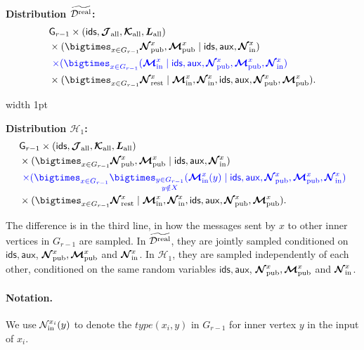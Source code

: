 \documentclass[11pt]{article}
\theoremstyle{definition}
\newcommand{\rv}[1]{\ensuremath{{\mathsf{#1}}}\xspace}
\newcommand{\Ninner}[2]{\ensuremath{\mathcal{N}_{\textnormal{in}}^{#1_{#2}}}}
\newcommand{\rNinner}[2]{\ensuremath{\bm{\mathcal{N}}_{\textnormal{in}}^{#1_{#2}}}}
\newcommand{\cH}{\ensuremath{\mathcal{H}}}
\newcommand{\cD}{\ensuremath{\mathcal{D}}}
\newcommand{\cDreal}{\ensuremath{\cD^{\textnormal{real}}}}
\newcommand{\cDrealtil}{\ensuremath{\widetilde{\cDreal}}}
\newcommand{\raux}{\ensuremath{\rv{aux}}}
\newcommand{\rcJall}{\ensuremath{\bm{\mathcal{J}}_{\textnormal{all}}}}
\newcommand{\rcKall}{\ensuremath{\bm{\mathcal{K}}_{\textnormal{all}}}}
\newcommand{\rLall}{\ensuremath{\bm{L}_{\textnormal{all}}}}
\newcommand{\rNpub}[1]{\ensuremath{\bm{\mathcal{N}}_{\textnormal{pub}}^{#1}}}
\newcommand{\rMpub}[1]{\ensuremath{\bm{\mathcal{M}}_{\textnormal{pub}}^{#1}}}
\newcommand{\rMinner}[1]{\ensuremath{\bm{\mathcal{M}}_{\textnormal{in}}^{#1}}}
\newcommand{\rNrest}[1]{\ensuremath{\bm{\mathcal{N}}^{#1}_{\textnormal{rest}}}}
\newcommand{\rG}{\ensuremath{\rv{G}}}
\newcommand{\rids}{\ensuremath{\rv{ids}}}
\begin{document}
\vspace{3mm}
\hspace{-1.5em}
\begin{minipage}{0.49\textwidth}
	\small
		\textbf{Distribution $\cDrealtil$:}
		\begin{align*}
		&\rG_{r-1} \times (\rids, \rcJall, \rcKall, \rLall) \\
		&\times (\bigtimes_{x \in G_{r-1}} \rNpub{x}, \rMpub{x} \mid \rids, \raux, \rNinner{x}{})\\
		&~\eqcolor{\times (\bigtimes_{x \in G_{r-1}} (\rMinner{x} \mid  \rids, \raux, \rNpub{x}, \rMpub{x}, \rNinner{x}{})}  \\
		&\times (\bigtimes_{x \in G_{r-1}}  \rNrest{x} \mid \rMinner{x}, \rNinner{x}{}, \rids, \raux, \rNpub{x}, \rMpub{x}). 
	\end{align*}
\end{minipage}
\vrule width 1pt %
\hspace{0.5em} %
\begin{minipage}{0.49\textwidth}
	\small
		\textbf{Distribution $\cH_1$:}
	\begin{align*}
		&\rG_{r-1} \times (\rids, \rcJall, \rcKall, \rLall)\\
		&\times (\bigtimes_{x \in G_{r-1}} \rNpub{x}, \rMpub{x} \mid \rids, \raux, \rNinner{x}{})  \\
		&~\eqcolor{\times (\bigtimes_{x \in G_{r-1}}\bigtimes_{\substack{y \in G_{r-1} \\y \notin X}}  (\rMinner{x}(y) \mid  \rids, \raux, \rNpub{x}, \rMpub{x}, \rNinner{x}{})}   \\
		&\times (\bigtimes_{x \in G_{r-1}}  \rNrest{x} \mid \rMinner{x}, \rNinner{x}{}, \rids, \raux, \rNpub{x}, \rMpub{x}). 
	\end{align*}
\end{minipage}
\vspace{3mm}

The difference is in the third line, in how the messages sent by $x$ to other inner vertices in $G_{r-1}$ are sampled. In $\cDrealtil$, they are jointly sampled conditioned on $\rids, \raux$, $\rNpub{x}, \rMpub{x}$ and $\rNinner{x}{}$. In $\cH_1$, they are sampled independently of each other, conditioned on the same random variables $\rids, \raux$, $\rNpub{x}, \rMpub{x}$ and $\rNinner{x}{}$. 

\paragraph{Notation.}
We use $\Ninner{x}{i}(y)$ to denote the $type(x_i, y)$ in $G_{r-1}$ for inner vertex $y$ in the input of $x_i$. 
\end{document}
